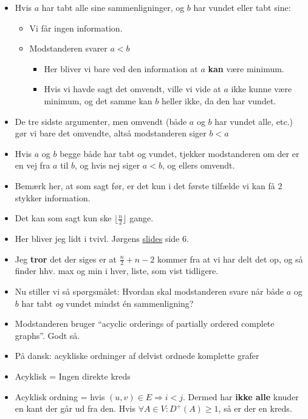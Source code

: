 \begin{frame}[allowframebreaks]
\begin{itemize}
   \item Hvis $a$ har tabt alle sine sammenligninger, og $b$ har vundet eller tabt sine:
         \begin{itemize}
           \item Vi får ingen information.
           \item Modstanderen svarer $a < b$
                 \begin{itemize}
                   \item Her bliver vi bare ved den information at $a$ \textbf{kan} være minimum.
                   \item Hvis vi havde sagt det omvendt, ville vi vide at $a$ ikke kunne være minimum, og det samme kan $b$ heller ikke, da den har vundet.
                 \end{itemize}
         \end{itemize}
   \item De tre sidste argumenter, men omvendt (både $a$ og $b$ har vundet alle, etc.) gør vi bare det omvendte, altså modstanderen siger $b < a$
   \item Hvis $a$ og $b$ begge både har tabt og vundet, tjekker modstanderen om der er en vej fra $a$ til $b$, og hvis nej siger $a < b$, og ellers omvendt.
   \item Bemærk her, at som sagt før, er det kun i det første tilfælde vi kan få 2 stykker information.
   \item Det kan som sagt kun ske $\lfloor \frac{n}{2} \rfloor$ gange.
   \item Her bliver jeg lidt i tvivl. Jørgens \href{https://imada.sdu.dk/u/jbj/DM553/Slides21/Lect22.pdf}{slides} side 6.
   \item Jeg \textbf{tror} det der siges er at $\frac{n}{2} + n-2$ kommer fra at vi har delt det op, og så finder hhv. max og min i hver, liste, som vist tidligere.
   \item Nu stiller vi så spørgsmålet: Hvordan skal modstanderen svare når både $a$ og $b$ har tabt \textit{og} vundet mindst én  sammenligning?
   \item Modstanderen bruger ``acyclic orderings of partially ordered complete graphs''. Godt så.
   \item På dansk: acykliske ordninger af delvist ordnede komplette grafer
   \item Acyklisk = Ingen direkte kreds
   \item Acyklisk ordning = hvis $(u,v) \in E \Rightarrow i < j $. Dermed har \textbf{ikke alle} knuder en kant der går ud fra den. Hvis $\forall A \in V : D^{+}(A) \ge 1$, så er der en kreds.

\end{itemize}
\end{frame}
